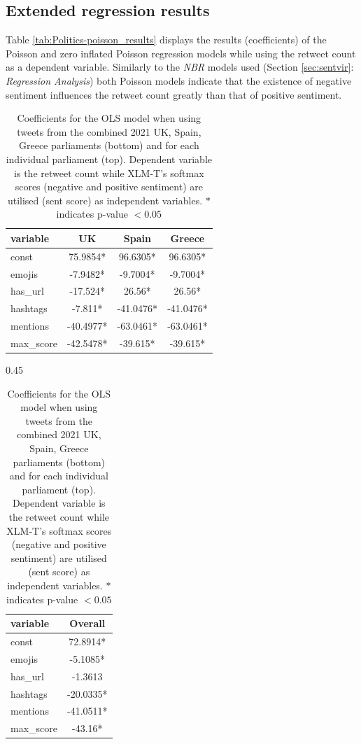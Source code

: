 \subsection{Extended regression results}
Table \ref{tab:Politics-poisson_results} displays the results (coefficients) of the Poisson and zero inflated Poisson regression models while using the retweet count as a dependent variable. Similarly to the \textit{NBR} models used (Section \ref{sec:sentvir}: \textit{Regression Analysis}) both Poisson models indicate that the existence of negative sentiment influences the retweet count greatly than that of positive sentiment.

\begin{table}[hbp!]
\centering
\begin{subtable}[t]{\textwidth}
\centering
\begin{tabular}{|l|c|c|c|}
\hline
\textbf{variable} & \textbf{UK} & \textbf{Spain} & \textbf{Greece} \\ \hline
const             & 75.9854*    & 96.6305*       & 96.6305*        \\ \hline
emojis            & -7.9482*    & -9.7004*       & -9.7004*        \\ \hline
has\_url          & -17.524*    & 26.56*         & 26.56*          \\ \hline
hashtags          & -7.811*     & -41.0476*      & -41.0476*       \\ \hline
mentions          & -40.4977*   & -63.0461*      & -63.0461*       \\ \hline
max\_score        & -42.5478*   & -39.615*       & -39.615*        \\ \hline
\end{tabular}
\end{subtable}

\vspace{1em}

\begin{subtable}[t]{0.45\textwidth}
\centering
\begin{tabular}{|l|c|}
\hline
\textbf{variable} & \textbf{Overall} \\ \hline
const             & 72.8914*         \\ \hline
emojis            & -5.1085*         \\ \hline
has\_url          & -1.3613          \\ \hline
hashtags          & -20.0335*        \\ \hline
mentions          & -41.0511*        \\ \hline
max\_score        & -43.16*          \\ \hline
\end{tabular}
\end{subtable}

\caption{Coefficients for the OLS model when using tweets from the combined 2021 UK, Spain, Greece parliaments (bottom) and for each individual parliament (top). Dependent variable is the retweet count while XLM-T's softmax scores (negative and positive sentiment) are utilised (sent score) as independent variables. $*$ indicates p-value $< 0.05$}
\label{tab:Politics-ols_results}
\end{table}

